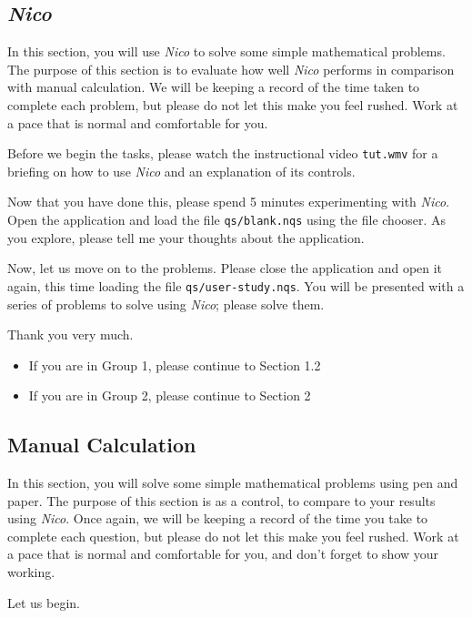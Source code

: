 \documentclass[14pt]{article}
\begin{document}
\subsection{\emph{Nico}}

In this section, you will use \emph{Nico} to solve some simple mathematical
problems.  The purpose of this section is to evaluate how well \emph{Nico}
performs in comparison with manual calculation.  We will be keeping a record of
the time taken to complete each problem, but please do not let this make you feel
rushed.  Work at a pace that is normal and comfortable for you.

Before we begin the tasks, please watch the instructional video
\verb¬tut.wmv¬ for a briefing on how to use \emph{Nico} and an explanation
of its controls.

Now that you have done this, please spend 5 minutes experimenting with
\emph{Nico}.  Open the application and load the file \verb¬qs/blank.nqs¬ using
the file chooser.  As you explore, please tell me your thoughts about the
application.

Now, let us move on to the problems.  Please close the application and open it
again, this time loading the file \verb¬qs/user-study.nqs¬.  You will be
presented with a series of problems to solve using \emph{Nico}; please solve
them.

Thank you very much.

\begin{itemize}
\item If you are in Group 1, please continue to Section 1.2
\item If you are in Group 2, please continue to Section 2
\end{itemize}

\subsection{Manual Calculation}

In this section, you will solve some simple mathematical problems using pen
and paper.  The purpose of this section is as a control, to compare to your
results using \emph{Nico}.  Once again, we will be keeping a record of the time
you take to complete each question, but please do not let this make you feel
rushed.  Work at a pace that is normal and comfortable for you, and don't forget
to show your working.

Let us begin.

\end{document}
